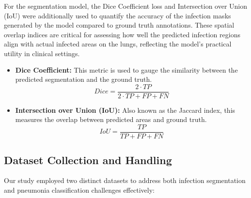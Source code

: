 \documentclass[10pt]{article}
\begin{document}
For the segmentation model, the Dice Coefficient loss and Intersection over Union (IoU) were additionally used to quantify the accuracy of the infection masks generated by the model compared to ground truth annotations. These spatial overlap indices are critical for assessing how well the predicted infection regions align with actual infected areas on the lungs, reflecting the model's practical utility in clinical settings.

\begin{itemize}
    \item \textbf{Dice Coefficient:} This metric is used to gauge the similarity between the predicted segmentation and the ground truth.
    \begin{equation}
    Dice = \frac{2 \cdot TP}{2 \cdot TP + FP + FN}
    \label{eq:dice}
    \end{equation}

    \item \textbf{Intersection over Union (IoU):} Also known as the Jaccard index, this measures the overlap between predicted areas and ground truth.
    \begin{equation}
    IoU = \frac{TP}{TP + FP + FN}
    \label{eq:iou}
    \end{equation}
\end{itemize}



\subsection{Dataset Collection and Handling}
Our study employed two distinct datasets to address both infection segmentation and pneumonia classification challenges effectively:
\end{document}
